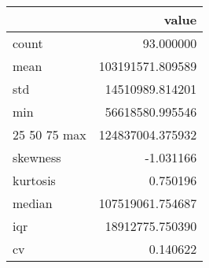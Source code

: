 \begin{tabular}{lr}
\toprule
 & value \\
\midrule
count & 93.000000 \\
mean & 103191571.809589 \\
std & 14510989.814201 \\
min & 56618580.995546 \\
25%
50%
75%
max & 124837004.375932 \\
skewness & -1.031166 \\
kurtosis & 0.750196 \\
median & 107519061.754687 \\
iqr & 18912775.750390 \\
cv & 0.140622 \\
\bottomrule
\end{tabular}
